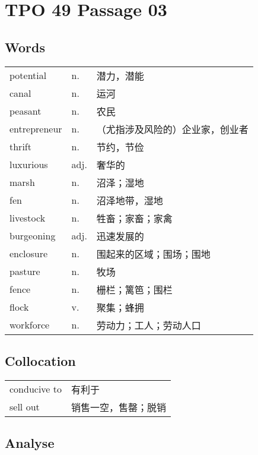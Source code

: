 \section{TPO 49 Passage 03}

\subsection{Words}

\begin{tabular}{lll}
    potential    & n.   & 潜力，潜能            \\
    canal        & n.   & 运河               \\
    peasant      & n.   & 农民               \\
    entrepreneur & n.   & （尤指涉及风险的）企业家，创业者 \\
    thrift       & n.   & 节约，节俭            \\
    luxurious    & adj. & 奢华的              \\
    marsh        & n.   & 沼泽；湿地            \\
    fen          & n.   & 沼泽地带，湿地          \\
    livestock    & n.   & 牲畜；家畜；家禽         \\
    burgeoning   & adj. & 迅速发展的            \\
    enclosure    & n.   & 围起来的区域；围场；围地     \\
    pasture      & n.   & 牧场               \\
    fence        & n.   & 栅栏；篱笆；围栏         \\
    flock        & v.   & 聚集；蜂拥            \\
    workforce    & n.   & 劳动力；工人；劳动人口      \\
\end{tabular}

\subsection{Collocation}

\begin{tabular}{ll}
    conducive to & 有利于        \\
    sell out     & 销售一空，售罄；脱销 \\
\end{tabular}

\subsection{Analyse}

